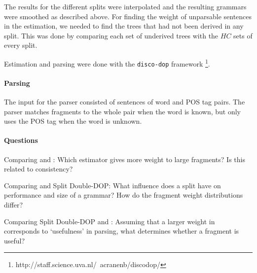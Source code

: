 The results for the different splits were interpolated and the resulting grammars were smoothed as described above. For finding the weight of unparsable sentences in the \dops{} estimation, we needed to find the trees that had not been derived in any split. This was done by comparing each set of underived trees with the $HC$ sets of every split.

Estimation and parsing were done with the {\tt disco-dop} framework \footnote{http://staff.science.uva.nl/~acranenb/discodop/}.

\paragraph{Parsing}
The input for the parser consisted of sentences of word and POS tag pairs. The parser matches fragments to the whole pair when the word is known, but only uses the POS tag when the word is unknown.



\paragraph{Questions}
Comparing \dops{} and \ddop{}: Which estimator gives more weight to large fragments? Is this related to consistency?

Comparing \ddop{} and Split Double-DOP: What influence does a split have on performance and size of a grammar? How do the fragment weight distributions differ?

Comparing Split Double-DOP and \dops{}: Assuming that a larger weight in \dops{} corresponds to `usefulness' in parsing, what determines whether a fragment is useful?

